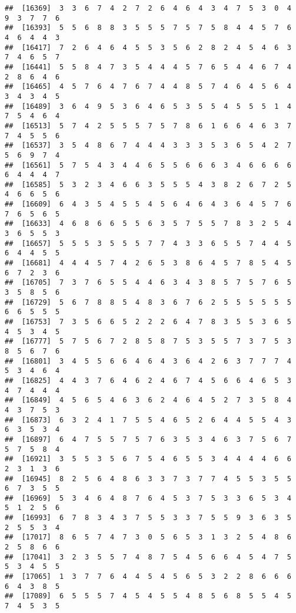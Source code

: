 \documentclass[
]{book}
\begin{document}
\begin{verbatim}
##  [16369]  3  3  6  7  4  2  7  2  6  4  6  4  3  4  7  5  3  0  4  9  3  7  7  6
##  [16393]  5  5  6  8  8  3  5  5  5  7  5  7  5  8  4  4  5  7  6  4  6  4  4  3
##  [16417]  7  2  6  4  6  4  5  5  3  5  6  2  8  2  4  5  4  6  3  7  4  6  5  7
##  [16441]  5  5  8  4  7  3  5  4  4  4  5  7  6  5  4  4  6  7  4  2  8  6  4  6
##  [16465]  4  5  7  6  4  7  6  7  4  4  8  5  7  4  6  4  5  6  4  3  4  3  4  5
##  [16489]  3  6  4  9  5  3  6  4  6  5  3  5  5  4  5  5  5  1  4  7  5  4  6  4
##  [16513]  5  7  4  2  5  5  5  7  5  7  8  6  1  6  6  4  6  3  7  7  4  5  5  6
##  [16537]  3  5  4  8  6  7  4  4  4  3  3  3  5  3  6  5  4  2  7  5  6  9  7  4
##  [16561]  5  7  5  4  3  4  4  6  5  5  6  6  6  3  4  6  6  6  6  6  4  4  4  7
##  [16585]  5  3  2  3  4  6  6  3  5  5  5  4  3  8  2  6  7  2  5  4  6  6  5  6
##  [16609]  6  4  3  5  4  5  5  4  5  6  4  6  4  3  6  4  5  7  6  7  6  5  6  5
##  [16633]  4  6  8  6  6  5  5  6  3  5  7  5  5  7  8  3  2  5  4  3  6  5  5  3
##  [16657]  5  5  5  3  5  5  5  7  7  4  3  3  6  5  5  7  4  4  5  6  4  4  5  5
##  [16681]  4  4  4  5  7  4  2  6  5  3  8  6  4  5  7  8  5  4  5  6  7  2  3  6
##  [16705]  7  3  7  6  5  5  4  4  6  3  4  3  8  5  7  5  7  6  5  3  5  8  5  6
##  [16729]  5  6  7  8  8  5  4  8  3  6  7  6  2  5  5  5  5  5  5  6  6  5  5  5
##  [16753]  7  3  5  6  6  5  2  2  2  6  4  7  8  3  5  5  3  6  5  4  5  3  4  5
##  [16777]  5  7  5  6  7  2  8  5  8  7  5  3  5  5  7  3  7  5  3  8  5  6  7  6
##  [16801]  3  4  5  5  6  6  4  6  4  3  6  4  2  6  3  7  7  7  4  5  3  4  6  4
##  [16825]  4  4  3  7  6  4  6  2  4  6  7  4  5  6  6  4  6  5  3  4  7  4  4  4
##  [16849]  4  5  6  5  4  6  3  6  2  4  6  4  5  2  7  3  5  8  4  4  3  7  5  3
##  [16873]  6  3  2  4  1  7  5  5  4  6  5  2  6  4  4  5  5  4  3  6  3  5  3  4
##  [16897]  6  4  7  5  5  7  5  7  6  3  5  3  4  6  3  7  5  6  7  5  7  5  8  4
##  [16921]  3  5  5  3  5  6  7  5  4  6  5  5  3  4  4  4  4  6  6  2  3  1  3  6
##  [16945]  8  2  5  6  4  8  6  3  3  7  3  7  7  4  5  5  3  5  5  6  7  3  5  5
##  [16969]  5  3  4  6  4  8  7  6  4  5  3  7  5  3  3  6  5  3  4  5  1  2  5  6
##  [16993]  6  7  8  3  4  3  7  5  5  3  3  7  5  5  9  3  6  3  5  2  5  5  3  4
##  [17017]  8  6  5  7  4  7  3  0  5  6  5  3  1  3  2  5  4  8  6  2  5  8  6  6
##  [17041]  3  2  3  5  5  7  4  8  7  5  4  5  6  6  4  5  4  7  5  5  3  4  5  5
##  [17065]  1  3  7  7  6  4  4  5  4  5  6  5  3  2  2  8  6  6  6  6  4  3  8  5
##  [17089]  6  5  5  5  7  4  5  4  5  5  4  8  5  6  8  5  5  4  5  7  4  5  3  5

\end{verbatim}
\end{document}
